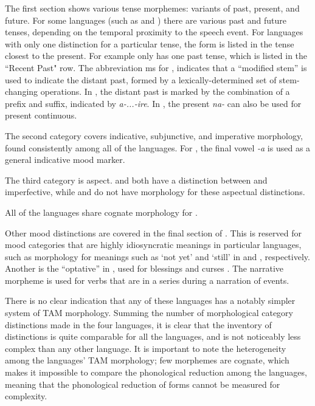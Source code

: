 \documentclass[output=paper,
modfonts
]{langscibook}
\begin{document}
\noindent The first section shows various tense morphemes: variants of past, present, and future. For some languages (such as  and ) there are various past and future tenses, depending on the temporal proximity to the speech event. 
For languages with only one distinction for a particular tense, the form is listed in the tense closest to the present. For example  only has one past tense, which is listed in the ``Recent Past" row. The abbreviation {\sc ms} for , indicates that a ``modified stem'' is used to indicate the distant past, formed by a lexically-determined set of stem-changing operations. In , the distant past is marked by the combination of a prefix and suffix, indicated by \emph{a-...-ire}.  %
In , the present \emph{na-} can also be used for present continuous.
	 
\newpage	 
The second category covers indicative, subjunctive, and imperative morphology, found consistently among all of the languages. For , the final vowel \emph{-a} is used as a general indicative mood marker. 
	 
The third category is aspect.  and  both have a distinction between  and imperfective, while  and  do not have morphology for these aspectual distinctions. 
	
All of the languages share cognate morphology for . 

Other mood distinctions  are covered in the final section of . This is reserved for mood categories that are highly idiosyncratic meanings in particular languages, such as morphology for meanings such as `not yet' and `still' in  and , respectively. Another is the ``optative'' in , used for blessings and curses \citep{Barlow1960}.  The narrative morpheme is used for verbs that are in a series during a narration of events. 
	 
There is no clear indication that any of these languages has a notably simpler system of TAM morphology.  Summing the number of morphological category distinctions made in the four languages, it is clear that the inventory of distinctions is quite comparable for all the languages, and  is not noticeably less complex than any other language. It is important to note the heterogeneity among the languages' TAM morphology; few morphemes are cognate, which makes it impossible to compare the phonological reduction among the languages, meaning that the phonological reduction of forms cannot be measured for complexity. 
\end{document}
